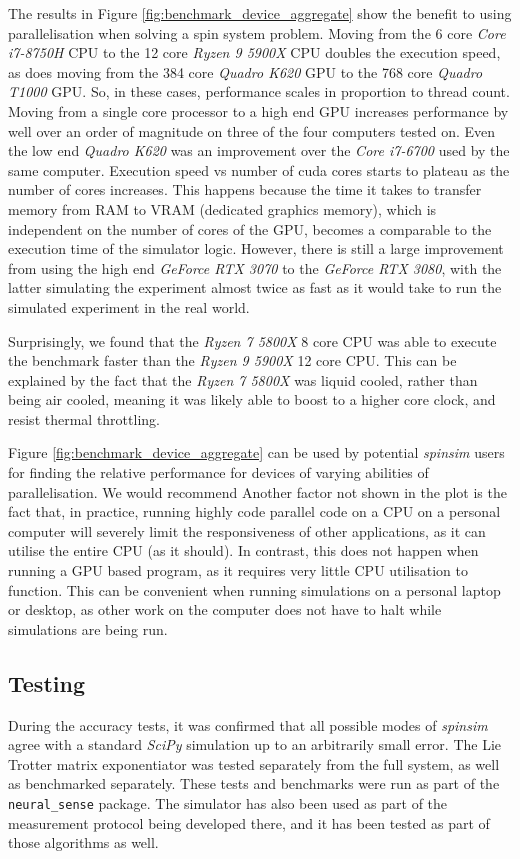 \documentclass{jors}
\begin{document}
		The results in Figure \ref{fig:benchmark_device_aggregate} show the benefit to using parallelisation when solving a spin system problem.
		Moving from the 6 core \emph{Core i7-8750H} CPU to the 12 core \emph{Ryzen 9 5900X} CPU doubles the execution speed, as does moving from the 384 core \emph{Quadro K620} GPU to the 768 core \emph{Quadro T1000} GPU.
		So, in these cases, performance scales in proportion to thread count.
		Moving from a single core processor to a high end GPU increases performance by well over an order of magnitude on three of the four computers tested on.
		Even the low end \emph{Quadro K620} was an improvement over the \emph{Core i7-6700} used by the same computer.
		Execution speed vs number of cuda cores starts to plateau as the number of cores increases.
		This happens because the time it takes to transfer memory from RAM to VRAM (dedicated graphics memory), which is independent on the number of cores of the GPU, becomes a comparable to the execution time of the simulator logic.
		However, there is still a large improvement from using the high end \emph{GeForce RTX 3070} to the \emph{GeForce RTX 3080}, with the latter simulating the experiment almost twice as fast as it would take to run the simulated experiment in the real world.

		Surprisingly, we found that the \emph{Ryzen 7 5800X} 8 core CPU was able to execute the benchmark faster than the \emph{Ryzen 9 5900X} 12 core CPU.
		This can be explained by the fact that the \emph{Ryzen 7 5800X} was liquid cooled, rather than being air cooled, meaning it was likely able to boost to a higher core clock, and resist thermal throttling.

		Figure \ref{fig:benchmark_device_aggregate} can be used by potential \emph{spinsim} users for finding the relative performance for devices of varying abilities of parallelisation.
		We would recommend Another factor not shown in the plot is the fact that, in practice, running highly code parallel code on a CPU on a personal computer will severely limit the responsiveness of other applications, as it can utilise the entire CPU (as it should).
		In contrast, this does not happen when running a GPU based program, as it requires very little CPU utilisation to function.
		This can be convenient when running simulations on a personal laptop or desktop, as other work on the computer does not have to halt while simulations are being run.

	\subsection{Testing}
		During the accuracy tests, it was confirmed that all possible modes of \emph{spinsim} agree with a standard \emph{SciPy} simulation up to an arbitrarily small error.
		The Lie Trotter matrix exponentiator was tested separately from the full system, as well as benchmarked separately.
		These tests and benchmarks were run as part of the \texttt{neural\_sense} package.
		The simulator has also been used as part of the measurement protocol being developed there, and it has been tested as part of those algorithms as well.
\end{document}

